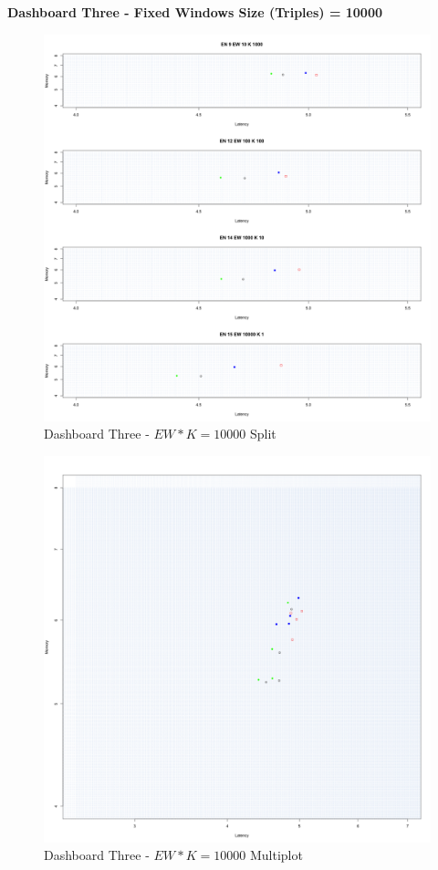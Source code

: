 \textbf{Dashboard Three - Fixed Windows Size (Triples) = 10000 } 


\begin{figure}[tbh]
	\centering
	\includegraphics[width=0.90\linewidth]{images/dashboard-3-split}	
	\caption[\textsc{Analyser} Investigation Stack - Level 0 - Dashboard Three - Split Version]{Dashboard Three - $EW*K=10000$ Split} 
	\label{fig:result_dashboard_proba}
\end{figure}
\begin{figure}[tbh]
	\centering
	\includegraphics[width=0.90\linewidth]{images/dashboard-3}	
	\caption[\textsc{Analyser} Investigation Stack - Level 0 - Dashboard Three - Multiplot Version]{Dashboard Three - $EW*K=10000$ Multiplot} 
	\label{fig:result_dashboard_probb}
\end{figure}


